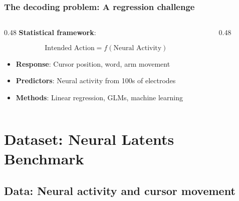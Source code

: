 \documentclass[slidestop,compress,mathserif]{beamer}
\begin{document}



\begin{frame}
\frametitle{The decoding problem: A regression challenge}

\begin{columns}
\begin{column}{0.48\textwidth}
\textbf{Statistical framework}:

\small
\begin{equation*}
\text{Intended Action} = f(\text{Neural Activity})
\end{equation*}

\begin{itemize}
\setlength\itemsep{0.3em}
\item \textbf{Response}: Cursor position, word, arm movement

\item \textbf{Predictors}: Neural activity from 100s of electrodes

\item \textbf{Methods}: Linear regression, GLMs, machine learning
\end{itemize}
\end{column}

\begin{column}{0.48\textwidth}
\begin{center}

\vspace{0.2cm}

\end{center}
\end{column}
\end{columns}

\end{frame}


\section{Dataset: Neural Latents Benchmark}

\subsection{Data: Neural activity and cursor movement}
\end{document}
